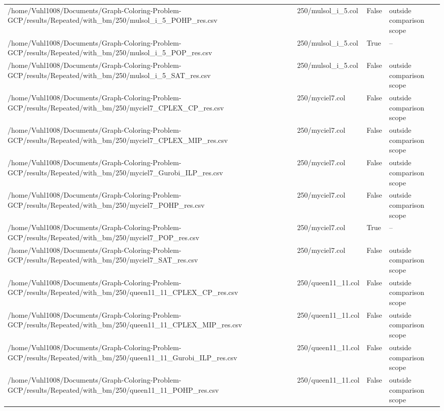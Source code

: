 \begin{table}[htbp]
\begin{tabular}{llll}
/home/Vuhl1008/Documents/Graph-Coloring-Problem-GCP/results/Repeated/with\_bm/250/mulsol\_i\_5\_POHP\_res.csv & 250/mulsol\_i\_5.col & False & outside comparison scope \\
/home/Vuhl1008/Documents/Graph-Coloring-Problem-GCP/results/Repeated/with\_bm/250/mulsol\_i\_5\_POP\_res.csv & 250/mulsol\_i\_5.col & True & -- \\
/home/Vuhl1008/Documents/Graph-Coloring-Problem-GCP/results/Repeated/with\_bm/250/mulsol\_i\_5\_SAT\_res.csv & 250/mulsol\_i\_5.col & False & outside comparison scope \\
/home/Vuhl1008/Documents/Graph-Coloring-Problem-GCP/results/Repeated/with\_bm/250/myciel7\_CPLEX\_CP\_res.csv & 250/myciel7.col & False & outside comparison scope \\
/home/Vuhl1008/Documents/Graph-Coloring-Problem-GCP/results/Repeated/with\_bm/250/myciel7\_CPLEX\_MIP\_res.csv & 250/myciel7.col & False & outside comparison scope \\
/home/Vuhl1008/Documents/Graph-Coloring-Problem-GCP/results/Repeated/with\_bm/250/myciel7\_Gurobi\_ILP\_res.csv & 250/myciel7.col & False & outside comparison scope \\
/home/Vuhl1008/Documents/Graph-Coloring-Problem-GCP/results/Repeated/with\_bm/250/myciel7\_POHP\_res.csv & 250/myciel7.col & False & outside comparison scope \\
/home/Vuhl1008/Documents/Graph-Coloring-Problem-GCP/results/Repeated/with\_bm/250/myciel7\_POP\_res.csv & 250/myciel7.col & True & -- \\
/home/Vuhl1008/Documents/Graph-Coloring-Problem-GCP/results/Repeated/with\_bm/250/myciel7\_SAT\_res.csv & 250/myciel7.col & False & outside comparison scope \\
/home/Vuhl1008/Documents/Graph-Coloring-Problem-GCP/results/Repeated/with\_bm/250/queen11\_11\_CPLEX\_CP\_res.csv & 250/queen11\_11.col & False & outside comparison scope \\
/home/Vuhl1008/Documents/Graph-Coloring-Problem-GCP/results/Repeated/with\_bm/250/queen11\_11\_CPLEX\_MIP\_res.csv & 250/queen11\_11.col & False & outside comparison scope \\
/home/Vuhl1008/Documents/Graph-Coloring-Problem-GCP/results/Repeated/with\_bm/250/queen11\_11\_Gurobi\_ILP\_res.csv & 250/queen11\_11.col & False & outside comparison scope \\
/home/Vuhl1008/Documents/Graph-Coloring-Problem-GCP/results/Repeated/with\_bm/250/queen11\_11\_POHP\_res.csv & 250/queen11\_11.col & False & outside comparison scope \\

\end{tabular}
\end{table}
